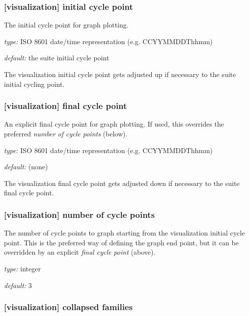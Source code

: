 \subsubsection[initial cycle point]{[visualization] \textrightarrow initial cycle point}

The initial cycle point for graph plotting.
\begin{myitemize}
    \item {\em type:} ISO 8601 date/time representation (e.g. CCYYMMDDThhmm)
    \item {\em default:} the suite initial cycle point
\end{myitemize}
The visualization initial cycle point gets adjusted up if necessary to the
suite initial cycling point.

\subsubsection[final cycle point]{[visualization] \textrightarrow final cycle point}

An explicit final cycle point for graph plotting. If used, this overrides the
preferred {\em number of cycle points} (below).
\begin{myitemize}
    \item {\em type:} ISO 8601 date/time representation (e.g. CCYYMMDDThhmm)
    \item {\em default:} (none)
\end{myitemize}
The visualization final cycle point gets adjusted down if necessary to the
suite final cycle point.

\subsubsection[number of cycle points]{[visualization] \textrightarrow number of cycle points}

The number of cycle points to graph starting from the visualization initial
cycle point. This is the preferred way of defining the graph end point, but
it can be overridden by an explicit {\em final cycle point} (above).
\begin{myitemize}
    \item {\em type:} integer
    \item {\em default:} 3
\end{myitemize}

\subsubsection[collapsed families]{[visualization] \textrightarrow collapsed families}

